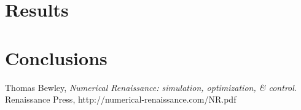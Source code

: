 \documentclass{article}
\begin{document}
\section{Results}

\section{Conclusions}


\newpage
\begin{thebibliography}{9}
  Thomas Bewley,
  \emph{Numerical Renaissance: simulation, optimization, \& control}.
  Renaissance Press,
  http://numerical-renaissance.com/NR.pdf

\end{thebibliography}
\end{document}
